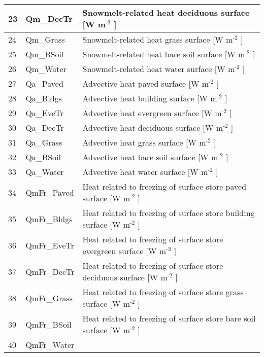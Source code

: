 \documentclass[letterpaper,10pt,english]{sphinxmanual}
\begin{document}
\begin{savenotes}
\begin{longtable}{|l|l|l|}
\\
\hline
23
&
Qm\_DecTr
&
Snowmelt-related heat \textendash{} deciduous surface {[}W m$^{\text{-2}}$ {]}
\\
\hline
24
&
Qm\_Grass
&
Snowmelt-related heat \textendash{} grass surface {[}W m$^{\text{-2}}$ {]}
\\
\hline
25
&
Qm\_BSoil
&
Snowmelt-related heat \textendash{} bare soil surface {[}W m$^{\text{-2}}$ {]}
\\
\hline
26
&
Qm\_Water
&
Snowmelt-related heat \textendash{} water surface {[}W m$^{\text{-2}}$ {]}
\\
\hline
27
&
Qa\_Paved
&
Advective heat \textendash{} paved surface {[}W m$^{\text{-2}}$ {]}
\\
\hline
28
&
Qa\_Bldgs
&
Advective heat \textendash{} building surface {[}W m$^{\text{-2}}$ {]}
\\
\hline
29
&
Qa\_EveTr
&
Advective heat \textendash{} evergreen surface {[}W m$^{\text{-2}}$ {]}
\\
\hline
30
&
Qa\_DecTr
&
Advective heat \textendash{} deciduous surface {[}W m$^{\text{-2}}$ {]}
\\
\hline
31
&
Qa\_Grass
&
Advective heat \textendash{} grass surface {[}W m$^{\text{-2}}$ {]}
\\
\hline
32
&
Qa\_BSoil
&
Advective heat \textendash{} bare soil surface {[}W m$^{\text{-2}}$ {]}
\\
\hline
33
&
Qa\_Water
&
Advective heat \textendash{} water surface {[}W m$^{\text{-2}}$ {]}
\\
\hline
34
&
QmFr\_Paved
&
Heat related to freezing of surface store \textendash{} paved surface {[}W m$^{\text{-2}}$ {]}
\\
\hline
35
&
QmFr\_Bldgs
&
Heat related to freezing of surface store \textendash{} building surface {[}W m$^{\text{-2}}$ {]}
\\
\hline
36
&
QmFr\_EveTr
&
Heat related to freezing of surface store \textendash{} evergreen surface {[}W m$^{\text{-2}}$ {]}
\\
\hline
37
&
QmFr\_DecTr
&
Heat related to freezing of surface store \textendash{} deciduous surface {[}W m$^{\text{-2}}$ {]}
\\
\hline
38
&
QmFr\_Grass
&
Heat related to freezing of surface store \textendash{} grass surface {[}W m$^{\text{-2}}$ {]}
\\
\hline
39
&
QmFr\_BSoil
&
Heat related to freezing of surface store \textendash{} bare soil surface {[}W m$^{\text{-2}}$ {]}
\\
\hline
40
&
QmFr\_Water

\end{longtable}
\end{savenotes}
\end{document}
